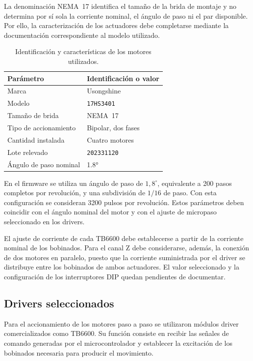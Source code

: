 \documentclass[blue,fullpaper]{ludusofficial}  %
\begin{document}
La denominación NEMA~17 identifica el tamaño
de la brida de montaje y no determina por sí sola
la corriente nominal, el ángulo de paso ni el par
disponible. Por ello, la caracterización de los
actuadores debe completarse mediante la documentación
correspondiente al modelo utilizado.

\begin{table}[htbp]
    \centering
    \small
    \caption{Identificación y características
    de los motores utilizados.}
    \label{tab:motores-seleccionados}
    \begin{tabular}{ll}
        \hline
        Parámetro & Identificación o valor \\
        \hline
        Marca & Usongshine \\
        Modelo & \texttt{17HS3401} \\
        Tamaño de brida & NEMA~17 \\
        Tipo de accionamiento & Bipolar, dos fases \\
        Cantidad instalada & Cuatro motores \\
        Lote relevado & \texttt{202331120} \\
        Ángulo de paso nominal & 1.8°\\
    \end{tabular}
\end{table}

En el firmware se utiliza un ángulo de paso
de $1{,}8^\circ$, equivalente a 200 pasos completos
por revolución, y una subdivisión de $1/16$ de paso.
Con esta configuración se consideran 3200 pulsos
por revolución. Estos parámetros deben coincidir
con el ángulo nominal del motor y con el ajuste
de micropaso seleccionado en los drivers.

El ajuste de corriente de cada TB6600 debe
establecerse a partir de la corriente nominal
de los bobinados. Para el canal Z debe considerarse,
además, la conexión de dos motores en paralelo,
puesto que la corriente suministrada por el driver
se distribuye entre los bobinados de ambos actuadores.
El valor seleccionado y la configuración de los
interruptores DIP quedan pendientes de documentar.


\subsection{Drivers seleccionados}

Para el accionamiento de los motores paso a paso
se utilizaron módulos driver comercializados como
TB6600. Su función consiste en recibir las señales
de comando generadas por el microcontrolador y
establecer la excitación de los bobinados necesaria
para producir el movimiento.
\end{document}
